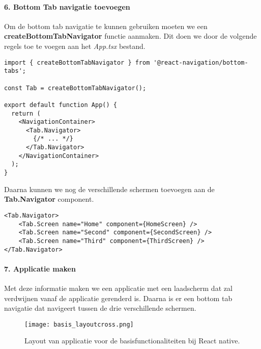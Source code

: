 \paragraph{6. Bottom Tab navigatie toevoegen}
Om de bottom tab navigatie te kunnen gebruiken moeten we een \textbf{createBottomTabNavigator}
functie aanmaken. Dit doen we door de volgende regels toe te voegen aan het \textit{App.tsx} bestand.
\begin{verbatim}
import { createBottomTabNavigator } from '@react-navigation/bottom-tabs';

const Tab = createBottomTabNavigator();

export default function App() {
  return (
    <NavigationContainer>
      <Tab.Navigator>
        {/* ... */}
      </Tab.Navigator>
    </NavigationContainer>
  );
}
\end{verbatim}
Daarna kunnen we nog de verschillende schermen toevoegen aan de \textbf{Tab.Navigator} component.
\begin{verbatim}
<Tab.Navigator>
    <Tab.Screen name="Home" component={HomeScreen} />
    <Tab.Screen name="Second" component={SecondScreen} />
    <Tab.Screen name="Third" component={ThirdScreen} />
</Tab.Navigator>
\end{verbatim}

\paragraph{7. Applicatie maken}
Met deze informatie maken we een applicatie met een laadscherm dat zal verdwijnen vanaf de 
applicatie gerenderd is. Daarna is er een bottom tab navigatie dat navigeert tussen 
de drie verschillende schermen. 
\begin{figure}[H]
    \centering
    \texttt{[image: basis\_layoutcross.png]}
    \caption{Layout van applicatie voor de basisfunctionaliteiten bij React native.}
\end{figure}